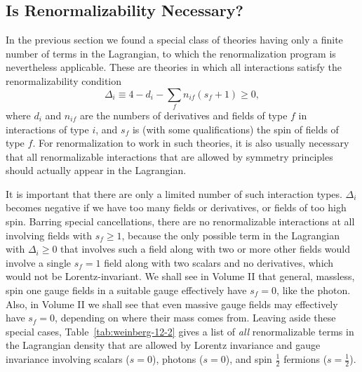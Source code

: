 
\subsection{Is Renormalizability Necessary?}
\label{sec:12.3}

In the previous section we found a special class of theories having only
a finite number of terms in the Lagrangian, to which the renormalization
program is nevertheless applicable. These are theories in which all
interactions satisfy the renormalizability condition
\[
\Delta_i\equiv 4-d_i-\sum_f n_{if}(s_f+1)\geq 0,
\]
where $d_i$ and $n_{if}$ are the numbers of derivatives and fields of type
$f$ in interactions of type $i$, and $s_f$ is (with some qualifications) the
spin of fields of type $f$. For renormalization to work in such theories, it
is also usually necessary that all renormalizable interactions that are
allowed by symmetry principles should actually appear in the Lagrangian.

It is important that there are only a limited number of such interaction
types. $\Delta_i$ becomes negative if we have too many fields or derivatives,
or fields of too high spin. Barring special cancellations, there are no
renormalizable interactions at all involving fields with $s_f\geq 1$, because
the only possible term in the Lagrangian with $\Delta_i\geq 0$ that involves
such a field along with two or more other fields would involve a single
$s_f=1$ field along with two scalars and no derivatives, which would not be
Lorentz-invariant. We shall see in Volume II that general, massless, spin one
gauge fields in a suitable gauge effectively have $s_f=0$, like the photon.
Also, in Volume II we shall see that even massive gauge fields may effectively
have $s_f=0$, depending on where their mass comes from. Leaving aside these
special cases, Table~\ref{tab:weinberg-12-2} gives a list of \emph{all}
renormalizable terms in the Lagrangian density that are allowed by Lorentz
invariance and gauge invariance involving scalars ($s=0$), photons ($s=0$),
and spin $\tfrac12$ fermions ($s=\tfrac12$).



